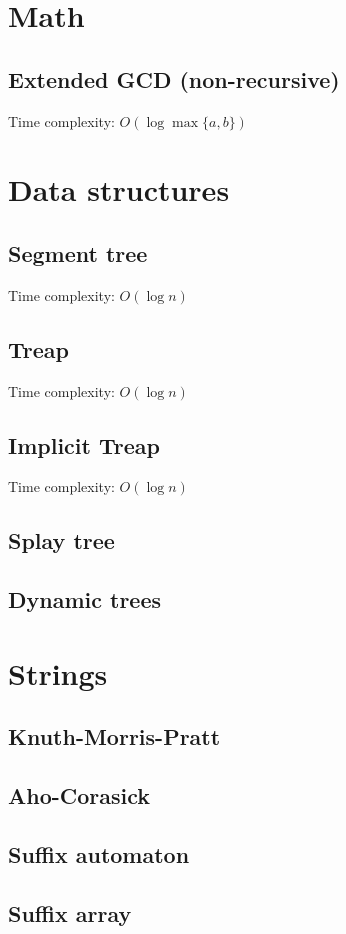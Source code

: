 \documentclass[12pt]{article}
\begin{document}
\pagestyle{fancy}
\newpage
\section{Math}
\subsection{Extended GCD (non-recursive)}
Time complexity: $O(\log \max \{a, b\})$

\section{Data structures}
\subsection{Segment tree}
Time complexity: $O(\log n)$
\subsection{Treap}
Time complexity: $O(\log n)$
\subsection{Implicit Treap}
Time complexity: $O(\log n)$
\subsection{Splay tree}
\subsection{Dynamic trees}
\section{Strings}
\subsection{Knuth-Morris-Pratt}

\subsection{Aho-Corasick}
\subsection{Suffix automaton}
\subsection{Suffix array}
\end{document}
